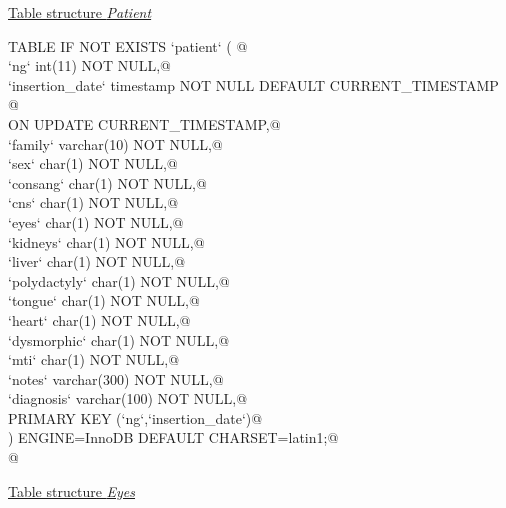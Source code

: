 \documentclass[a4paper]{report}
\begin{document}
\underline{Table structure \textit{Patient}}
\begin{flushleft} \small \label{scrap1}
\begin{list}{}{} \item
\mbox{}\verb@CREATE TABLE IF NOT EXISTS `patient` ( @\\
\mbox{}\verb@  `ng` int(11) NOT NULL,@\\
\mbox{}\verb@  `insertion_date` timestamp NOT NULL DEFAULT CURRENT_TIMESTAMP @\\
\mbox{}\verb@      ON UPDATE CURRENT_TIMESTAMP,@\\
\mbox{}\verb@  `family` varchar(10) NOT NULL,@\\
\mbox{}\verb@  `sex` char(1) NOT NULL,@\\
\mbox{}\verb@  `consang` char(1) NOT NULL,@\\
\mbox{}\verb@  `cns` char(1) NOT NULL,@\\
\mbox{}\verb@  `eyes` char(1) NOT NULL,@\\
\mbox{}\verb@  `kidneys` char(1) NOT NULL,@\\
\mbox{}\verb@  `liver` char(1) NOT NULL,@\\
\mbox{}\verb@  `polydactyly` char(1) NOT NULL,@\\
\mbox{}\verb@  `tongue` char(1) NOT NULL,@\\
\mbox{}\verb@  `heart` char(1) NOT NULL,@\\
\mbox{}\verb@  `dysmorphic` char(1) NOT NULL,@\\
\mbox{}\verb@  `mti` char(1) NOT NULL,@\\
\mbox{}\verb@  `notes` varchar(300) NOT NULL,@\\
\mbox{}\verb@`diagnosis` varchar(100) NOT NULL,@\\
\mbox{}\verb@  PRIMARY KEY (`ng`,`insertion_date`)@\\
\mbox{}\verb@) ENGINE=InnoDB DEFAULT CHARSET=latin1;@\\
\mbox{}\verb@ @\\
\end{list}
\vspace{-1ex}
\footnotesize\addtolength{\baselineskip}{-1ex}
\end{flushleft}
\underline{Table structure \textit{Eyes}}
\end{document}
